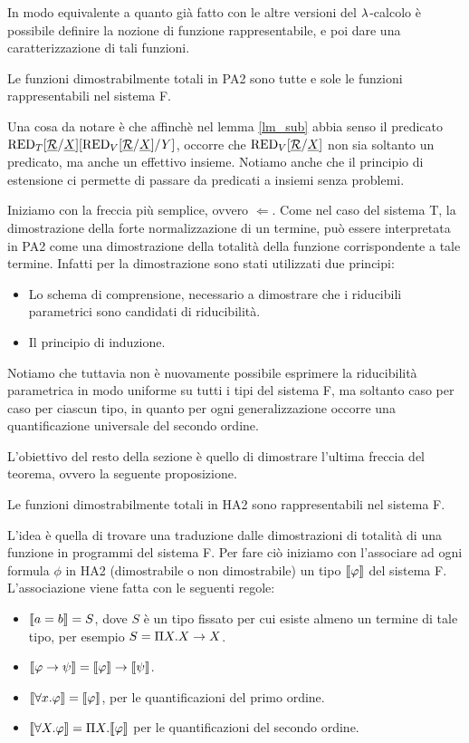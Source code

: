 \documentclass[]{marticle}
\begin{document}
In modo equivalente a quanto gi\`a fatto con le altre versioni del $\lambda$-calcolo
\`e possibile definire la nozione di funzione rappresentabile, e poi dare una
caratterizzazione di tali funzioni.

\begin{block}[Teorema]
    Le funzioni dimostrabilmente totali in PA2 sono tutte e sole le
    funzioni rappresentabili nel sistema F.
\end{block}

Una cosa da notare \`e che affinch\`e nel lemma \ref{lm_sub} abbia senso il
predicato $\text{RED}_{T}[\underline{\mathcal{R}}/\underline{X}] [\text{RED}_{V}[\underline{\mathcal{R}}/\underline{X}]/Y]$, occorre che $\text{RED}_{V}[\underline{\mathcal{R}}/\underline{X}]$
non sia soltanto un predicato, ma anche un effettivo insieme.  Notiamo anche che
il principio di estensione ci permette di passare da predicati a insiemi senza
problemi.


Iniziamo con la freccia pi\`u semplice, ovvero $\Leftarrow$. Come nel caso del
sistema T, la dimostrazione della forte normalizzazione di un termine, pu\`o
essere interpretata in PA2 come una dimostrazione della totalit\`a della
funzione corrispondente a tale termine. Infatti per la dimostrazione sono stati
utilizzati due principi:
\begin{itemize}
    \item Lo schema di comprensione, necessario a dimostrare che i riducibili
        parametrici sono candidati di riducibilit\`a. 
    \item Il principio di induzione.
\end{itemize}

Notiamo che tuttavia non \`e nuovamente possibile esprimere la riducibilit\`a
parametrica in modo uniforme su tutti i tipi del sistema F, ma soltanto caso per
caso per ciascun tipo, in quanto per ogni generalizzazione occorre una
quantificazione universale del secondo ordine.

L'obiettivo del resto della sezione \`e quello di dimostrare l'ultima freccia
del teorema, ovvero la seguente proposizione.
\begin{block}[Proposizione]
    Le funzioni dimostrabilmente totali in HA2 sono rappresentabili nel sistema
    F.
\end{block}

L'idea \`e quella di trovare una traduzione dalle dimostrazioni di totalit\`a di
una funzione in programmi del sistema F. Per fare ci\`o iniziamo con
l'associare ad ogni formula $\phi$ in HA2 (dimostrabile o non dimostrabile) un
tipo $\llbracket \varphi \rrbracket$ del sistema F. L'associazione viene fatta con le seguenti
regole:
\begin{itemize}
    \item $\llbracket a=b \rrbracket = S$, dove $S$ \`e un tipo fissato per cui esiste almeno un
        termine di tale tipo, per esempio $S=\Pi X.X\rightarrow X$.
    \item $\llbracket \varphi\rightarrow\psi \rrbracket=\llbracket \varphi \rrbracket\rightarrow\llbracket \psi \rrbracket$.
    \item $\llbracket \forall x.\varphi \rrbracket=\llbracket \varphi \rrbracket$, per le quantificazioni del primo
        ordine.
    \item $\llbracket \forall X.\varphi \rrbracket=\Pi X.\llbracket \varphi \rrbracket$ per le quantificazioni del secondo
        ordine.
\end{itemize}
\end{document}
